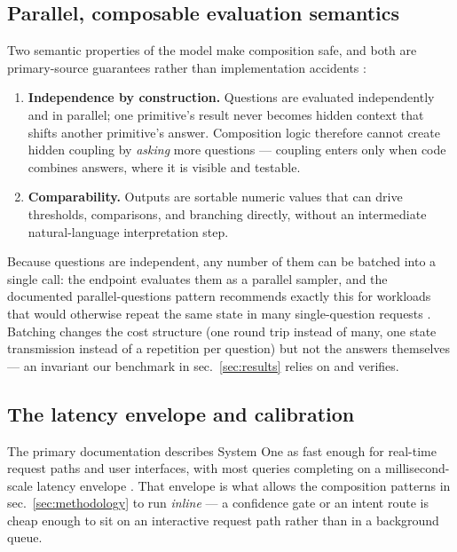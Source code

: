 \documentclass[
  english,
]{article}
\providecommand{\tightlist}{%
  \setlength{\itemsep}{0pt}\setlength{\parskip}{0pt}}
\begin{document}
\subsection{Parallel, composable evaluation
semantics}\label{parallel-composable-evaluation-semantics}

Two semantic properties of the model make composition safe, and both are
primary-source guarantees rather than implementation accidents
\citep{typesafe2026systemone}:

\begin{enumerate}
\def\labelenumi{\arabic{enumi}.}
\tightlist
\item
  \textbf{Independence by construction.} Questions are evaluated
  independently and in parallel; one primitive's result never becomes
  hidden context that shifts another primitive's answer. Composition
  logic therefore cannot create hidden coupling by \emph{asking} more
  questions --- coupling enters only when code combines answers, where
  it is visible and testable.
\item
  \textbf{Comparability.} Outputs are sortable numeric values that can
  drive thresholds, comparisons, and branching directly, without an
  intermediate natural-language interpretation step.
\end{enumerate}

Because questions are independent, any number of them can be batched
into a single call: the endpoint evaluates them as a parallel sampler,
and the documented parallel-questions pattern recommends exactly this
for workloads that would otherwise repeat the same state in many
single-question requests \citep{typesafe2026patterns}. Batching changes
the cost structure (one round trip instead of many, one state
transmission instead of a repetition per question) but not the answers
themselves --- an invariant our benchmark in sec.~\ref{sec:results}
relies on and verifies.

\subsection{The latency envelope and
calibration}\label{the-latency-envelope-and-calibration}

The primary documentation describes System One as fast enough for
real-time request paths and user interfaces, with most queries
completing on a millisecond-scale latency envelope
\citep{typesafe2026systemone}. That envelope is what allows the
composition patterns in sec.~\ref{sec:methodology} to run \emph{inline}
--- a confidence gate or an intent route is cheap enough to sit on an
interactive request path rather than in a background queue.
\end{document}
